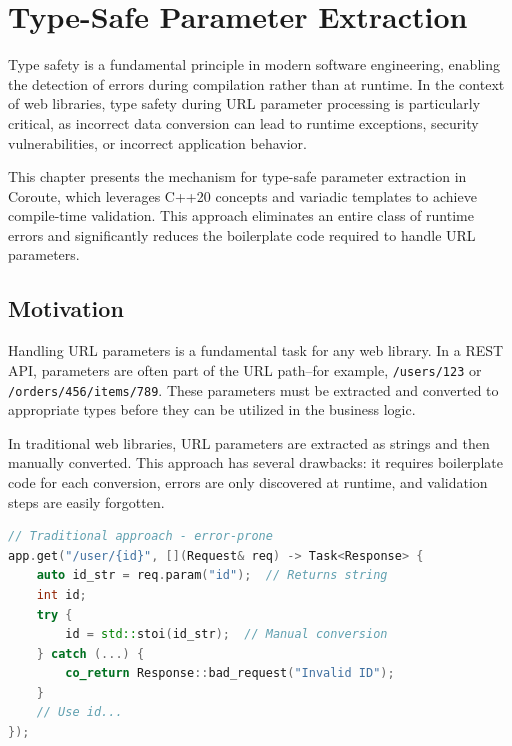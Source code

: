 \section{Type-Safe Parameter Extraction}
\label{sec:type_safe_params}

Type safety is a fundamental principle in modern software engineering, enabling the detection of errors during compilation rather than at runtime. In the context of web libraries, type safety during URL parameter processing is particularly critical, as incorrect data conversion can lead to runtime exceptions, security vulnerabilities, or incorrect application behavior.

This chapter presents the mechanism for type-safe parameter extraction in Coroute, which leverages C++20 concepts and variadic templates to achieve compile-time validation. This approach eliminates an entire class of runtime errors and significantly reduces the boilerplate code required to handle URL parameters.

\subsection{Motivation}

Handling URL parameters is a fundamental task for any web library. In a REST API, parameters are often part of the URL path--for example, \texttt{/users/123} or \texttt{/orders/456/items/789}. These parameters must be extracted and converted to appropriate types before they can be utilized in the business logic.

In traditional web libraries, URL parameters are extracted as strings and then manually converted. This approach has several drawbacks: it requires boilerplate code for each conversion, errors are only discovered at runtime, and validation steps are easily forgotten.

\begin{lstlisting}[language=C++, basicstyle=\small\ttfamily, caption={Traditional approach}]
// Traditional approach - error-prone
app.get("/user/{id}", [](Request& req) -> Task<Response> {
    auto id_str = req.param("id");  // Returns string
    int id;
    try {
        id = std::stoi(id_str);  // Manual conversion
    } catch (...) {
        co_return Response::bad_request("Invalid ID");
    }
    // Use id...
});
\end{lstlisting}

